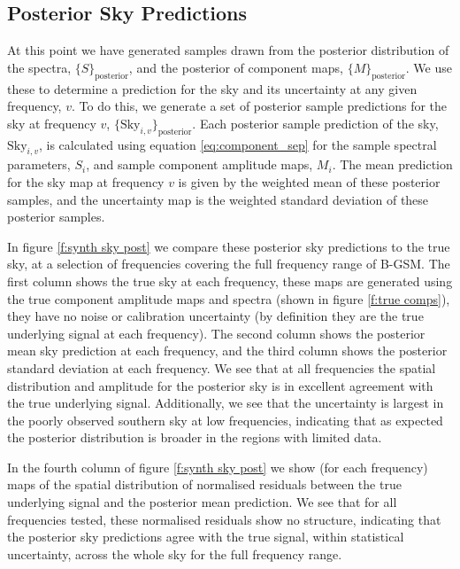 \documentclass[fleqn,usenatbib]{mnras}
\begin{document}
\subsection{Posterior Sky Predictions}
At this point we have generated samples drawn from the posterior distribution of the spectra, $\{S\}_\mathrm{posterior}$, and the posterior of component maps, $\{M\}_\mathrm{posterior}$. We use these to determine a prediction for the sky and its uncertainty at any given frequency, $v$. To do this, we generate a set of posterior sample predictions for the sky at frequency $v$, $\{\mathrm{Sky}_{i,v}\}_\mathrm{posterior}$. Each posterior sample prediction of the sky, $\mathrm{Sky}_{i,v}$, is calculated using equation \ref{eq:component_sep} for the sample spectral parameters, $S_i$, and sample component amplitude maps, $M_i$. The mean prediction for the sky map at frequency $v$ is given by the weighted mean of these posterior samples, and the uncertainty map is the weighted standard deviation of these posterior samples.

In figure \ref{f:synth sky post} we compare these posterior sky predictions to the true sky, at a selection of frequencies covering the full frequency range of B-GSM. The first column shows the true sky at each frequency, these maps are generated using the true component amplitude maps and spectra (shown in figure \ref{f:true comps}), they have no noise or calibration uncertainty (by definition they are the true underlying signal at each frequency). The second column shows the posterior mean sky prediction at each frequency, and the third column shows the posterior standard deviation at each frequency. We see that at all frequencies the spatial distribution and amplitude for the posterior sky is in excellent agreement with the true underlying signal. Additionally, we see that the uncertainty is largest in the poorly observed southern sky at low frequencies, indicating that as expected the posterior distribution is broader in the regions with limited data.


In the fourth column of figure \ref{f:synth sky post} we show (for each frequency) maps of the spatial distribution of normalised residuals between the true underlying signal and the posterior mean prediction. We see that for all frequencies tested, these normalised residuals show no structure, indicating that the posterior sky predictions agree with the true signal, within statistical uncertainty, across the whole sky for the full frequency range.
\end{document}
